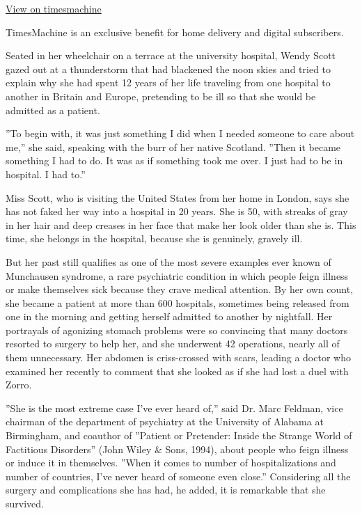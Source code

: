 \href{http://timesmachine.nytimes3xbfgragh.onion/timesmachine/1999/07/20/677973.html}{View
on timesmachine}

TimesMachine is an exclusive benefit for home delivery and digital
subscribers.

Seated in her wheelchair on a terrace at the university hospital, Wendy
Scott gazed out at a thunderstorm that had blackened the noon skies and
tried to explain why she had spent 12 years of her life traveling from
one hospital to another in Britain and Europe, pretending to be ill so
that she would be admitted as a patient.

''To begin with, it was just something I did when I needed someone to
care about me,'' she said, speaking with the burr of her native
Scotland. ''Then it became something I had to do. It was as if something
took me over. I just had to be in hospital. I had to.''

Miss Scott, who is visiting the United States from her home in London,
says she has not faked her way into a hospital in 20 years. She is 50,
with streaks of gray in her hair and deep creases in her face that make
her look older than she is. This time, she belongs in the hospital,
because she is genuinely, gravely ill.

But her past still qualifies as one of the most severe examples ever
known of Munchausen syndrome, a rare psychiatric condition in which
people feign illness or make themselves sick because they crave medical
attention. By her own count, she became a patient at more than 600
hospitals, sometimes being released from one in the morning and getting
herself admitted to another by nightfall. Her portrayals of agonizing
stomach problems were so convincing that many doctors resorted to
surgery to help her, and she underwent 42 operations, nearly all of them
unnecessary. Her abdomen is criss-crossed with scars, leading a doctor
who examined her recently to comment that she looked as if she had lost
a duel with Zorro.

''She is the most extreme case I've ever heard of,'' said Dr. Marc
Feldman, vice chairman of the department of psychiatry at the University
of Alabama at Birmingham, and coauthor of ''Patient or Pretender: Inside
the Strange World of Factitious Disorders'' (John Wiley \& Sons, 1994),
about people who feign illness or induce it in themselves. ''When it
comes to number of hospitalizations and number of countries, I've never
heard of someone even close.'' Considering all the surgery and
complications she has had, he added, it is remarkable that she survived.

